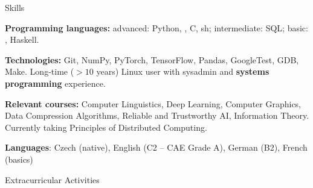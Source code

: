 \sekce Skills
 
{\bf Programming languages:} {\af advanced:} {\B Python}, {\B \Cpp}, {\B C}, {\B sh}; {\af intermediate:} {\B SQL}; {\af basic:} \Cis{}, Haskell.



{\bf Technologies:} {\af Git}, {\af NumPy}, {\af PyTorch}, {\af TensorFlow},
{\af Pandas}, {\af GoogleTest}, {\af GDB}, {\af Make}. Long-time ($> 10$ years) Linux user
with sysadmin and {\bf systems programming} experience.

\smallskip

{\bf Relevant courses:} Computer Linguistics, Deep Learning, Computer Graphics,
Data Compression Algorithms, Reliable and Trustworthy AI, Information
Theory. Currently taking Principles of Distributed Computing.

\smallskip

{\bf Languages}: Czech (native), English (C2 -- CAE Grade A), German (B2), French (basics)


\iffalse
\sekce Teaching

\itemindent=.5\itemindent
\itemnarrow=0pt
\list{-}
	\: Programming II practicals for advanced students (\url{https://mj.ucw.cz/vyuka/1920/p2x/}{Spring~2020}, \url{https://mj.ucw.cz/vyuka/1819/p2x/}{Spring~2019}), co-taught with Martin Mareš
	\: Programming I practicals for advanced students (\url{https://mj.ucw.cz/vyuka/1920/p1x/}{Autumn~2019}), co-taught with Martin Mareš
\endlist

\fi

\sekce Extracurricular Activities




